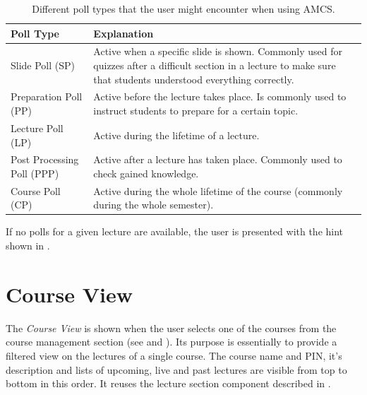 \begin{table}[H]
	{\renewcommand{\arraystretch}{2}
		\begin{tabular}{ | p{5cm} | p{10cm} |}
			\hline
			Poll Type & Explanation \\ \hline \hline
			Slide Poll (SP) & Active when a specific slide is shown. Commonly used for quizzes after a difficult section in a lecture to make sure that students understood everything correctly. \\ \hline
			Preparation Poll (PP) & Active before the lecture takes place. Is commonly used to instruct students to prepare for a certain topic. \\ \hline
			Lecture Poll (LP) & Active during the lifetime of a lecture. \\ \hline
			Post Processing Poll (PPP) & Active after a lecture has taken place. Commonly used to check gained knowledge. \\ \hline
			Course Poll (CP) & Active during the whole lifetime of the course (commonly during the whole semester). \\
			\hline
		\end{tabular}
	}
	\caption{Different poll types that the user might encounter when using AMCS.}
	\label{tab:pollTypes}
\end{table}

If no polls for a given lecture are available, the user is presented with the hint shown in \todogrf.

\section{Course View}
\label{section:soa:courseview}

The \emph{Course View} is shown when the user selects one of the courses from the course management section (see  and ). Its purpose is essentially to provide a filtered view on the lectures of a single course.
The course name and PIN, it's description and lists of upcoming, live and past lectures are visible from top to bottom in this order. It reuses the lecture section component described in .

